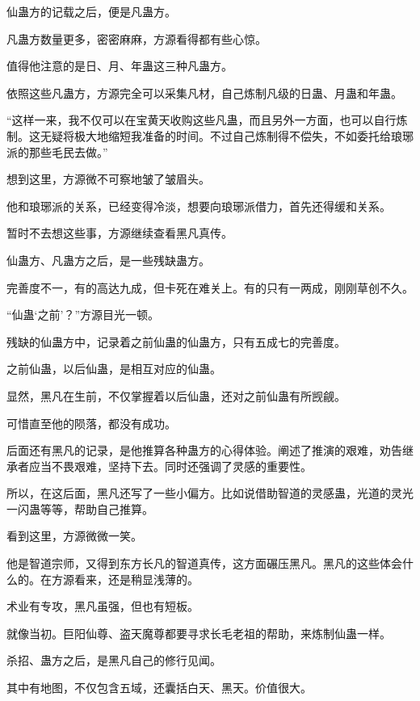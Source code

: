 
\begin{this_body}

仙蛊方的记载之后，便是凡蛊方。

凡蛊方数量更多，密密麻麻，方源看得都有些心惊。

值得他注意的是日、月、年蛊这三种凡蛊方。

依照这些凡蛊方，方源完全可以采集凡材，自己炼制凡级的日蛊、月蛊和年蛊。

“这样一来，我不仅可以在宝黄天收购这些凡蛊，而且另外一方面，也可以自行炼制。这无疑将极大地缩短我准备的时间。不过自己炼制得不偿失，不如委托给琅琊派的那些毛民去做。”

想到这里，方源微不可察地皱了皱眉头。

他和琅琊派的关系，已经变得冷淡，想要向琅琊派借力，首先还得缓和关系。

暂时不去想这些事，方源继续查看黑凡真传。

仙蛊方、凡蛊方之后，是一些残缺蛊方。

完善度不一，有的高达九成，但卡死在难关上。有的只有一两成，刚刚草创不久。

“仙蛊‘之前’？”方源目光一顿。

残缺的仙蛊方中，记录着之前仙蛊的仙蛊方，只有五成七的完善度。

之前仙蛊，以后仙蛊，是相互对应的仙蛊。

显然，黑凡在生前，不仅掌握着以后仙蛊，还对之前仙蛊有所觊觎。

可惜直至他的陨落，都没有成功。

后面还有黑凡的记录，是他推算各种蛊方的心得体验。阐述了推演的艰难，劝告继承者应当不畏艰难，坚持下去。同时还强调了灵感的重要性。

所以，在这后面，黑凡还写了一些小偏方。比如说借助智道的灵感蛊，光道的灵光一闪蛊等等，帮助自己推算。

看到这里，方源微微一笑。

他是智道宗师，又得到东方长凡的智道真传，这方面碾压黑凡。黑凡的这些体会什么的。在方源看来，还是稍显浅薄的。

术业有专攻，黑凡虽强，但也有短板。

就像当初。巨阳仙尊、盗天魔尊都要寻求长毛老祖的帮助，来炼制仙蛊一样。

杀招、蛊方之后，是黑凡自己的修行见闻。

其中有地图，不仅包含五域，还囊括白天、黑天。价值很大。


\end{this_body}
